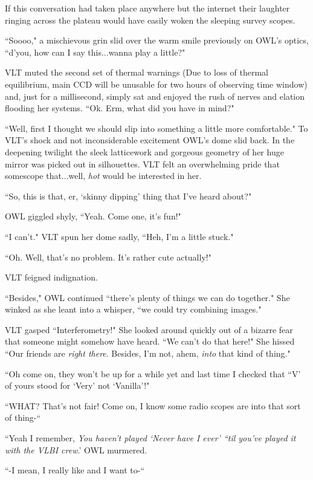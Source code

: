 \documentclass[12pt]{iopart}
\begin{document}
If this conversation had taken place anywhere but the internet their laughter ringing across the plateau would have easily woken the sleeping survey scopes.

``Soooo," a mischievous grin slid over the warm smile previously on OWL's optics, ``d'you, how can I say this...wanna play a little?"

VLT muted the second set of thermal warnings (Due to loss of thermal equilibrium, main CCD will be unusable for two hours of observing time window) and, just for a millisecond, simply sat and enjoyed the rush of nerves and elation flooding her systems. ``Ok. Erm, what did you have in mind?"

``Well, first I thought we should slip into something a little more comfortable." To VLT's shock and not inconsiderable excitement OWL's dome slid back. In the deepening twilight the sleek latticework and gorgeous geometry of her huge mirror was picked out in silhouettes. VLT felt an overwhelming pride that somescope that...well, \emph{hot} would be interested in her.

``So, this is that, er, `skinny dipping' thing that I've heard about?"

OWL giggled shyly, ``Yeah. Come one, it's fun!"

``I can't." VLT spun her dome sadly, ``Heh, I'm a little stuck."

``Oh. Well, that's no problem. It's rather cute actually!"

VLT feigned indignation.

``Besides," OWL continued ``there's plenty of things we can do together." She winked as she leant into a whisper, ``we could try combining images."

VLT gasped ``Interferometry!" She looked around quickly out of a bizarre fear that someone might somehow have heard. ``We can't do that here!" She hissed ``Our friends are \emph{right there}. Besides, I'm not, ahem, \emph{into} that kind of thing."

``Oh come on, they won't be up for a while yet and last time I checked that ``V' of yours stood for `Very' not `Vanilla'!"

``WHAT? That's not fair! Come on, I know some radio scopes are into that sort of thing-``

``Yeah I remember, \emph{You haven't played `Never have I ever' ``til you've played it with the VLBI crew}.' OWL murmered.

``-I mean, I really like and I want to-``
\end{document}

